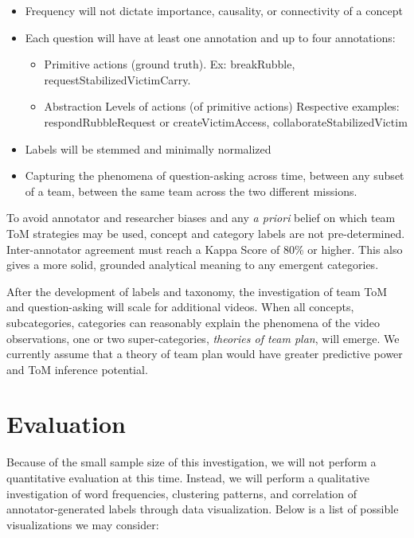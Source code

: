 \documentclass[10pt]{article}
\begin{document}
\begin{itemize}
    \item Frequency will not dictate importance, causality, or connectivity of a concept
    \item Each question will have at least one annotation and up to four
      annotations:
    \begin{itemize}
        \item Primitive actions (ground truth). Ex: breakRubble,
          requestStabilizedVictimCarry.
        \item Abstraction Levels of actions (of primitive actions) Respective
          examples: respondRubbleRequest or createVictimAccess, collaborateStabilizedVictim
    \end{itemize}
    \item Labels will be stemmed and minimally normalized
    \item Capturing the phenomena of question-asking across time, between any subset of a team, between the same team across the two different missions. 
\end{itemize}


To avoid annotator and researcher biases and any \emph{a priori} belief on
which team ToM strategies may be used, concept and category labels are not
pre-determined. Inter-annotator agreement must reach a Kappa Score of 80\% or
higher. This also gives a more solid, grounded analytical meaning to any
emergent categories. 

After the development of labels and taxonomy, the investigation of team ToM and
question-asking will scale for additional videos. When all concepts,
subcategories, categories can reasonably explain the phenomena of the video
observations, one or two super-categories, \emph{theories of team plan}, will
emerge. We currently assume that a theory of team plan would have greater
predictive power and ToM inference potential. 


\section{Evaluation}

Because of the small sample size of this investigation, we will not perform a
quantitative evaluation at this time. Instead, we will perform a qualitative
investigation of word frequencies, clustering patterns, and correlation of
annotator-generated labels through data visualization. Below is a list of
possible visualizations we may consider:
\end{document}

